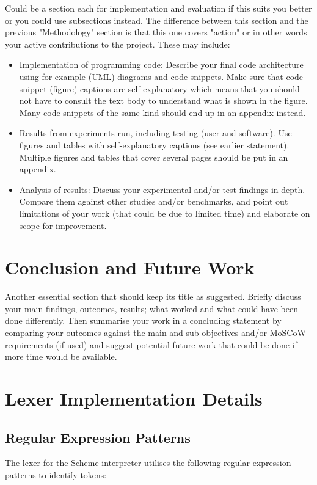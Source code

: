 \documentclass[final]{cmpreport_02}
\begin{document}
Could be a section each for implementation and evaluation if this suits you better or you could use subsections instead. The difference between this section and the previous "Methodology" section is that this one covers "action" or in other words your active contributions to the project. These may include:
\begin{itemize}
\item Implementation of programming code: Describe your final code architecture using for example (UML) diagrams and code snippets. Make sure that code snippet (figure) captions are self-explanatory which means that you should not have to consult the text body to understand what is shown in the figure. Many code snippets of the same kind should end up in an appendix instead.
\item Results from experiments run, including testing (user and software). Use figures and tables with self-explanatory captions (see earlier statement). Multiple figures and tables that cover several pages should be put in an appendix.
\item Analysis of results: Discuss your experimental and/or test findings in depth. Compare them against other studies and/or benchmarks, and point out limitations of your work (that could be due to limited time) and elaborate on scope for improvement.
\end{itemize}

\section{Conclusion and Future Work}

Another essential section that should keep its title as suggested. Briefly discuss your main findings, outcomes, results; what worked and what could have been done differently. Then summarise your work in a concluding statement by comparing your outcomes against the main and sub-objectives and/or MoSCoW requirements (if used) and suggest potential future work that could be done if more time would be available.

\clearpage



\appendix
\clearpage
\section{Lexer Implementation Details} \label{app:regex}

\subsection{Regular Expression Patterns}
The lexer for the Scheme interpreter utilises the following regular expression patterns to identify tokens:
\end{document}
